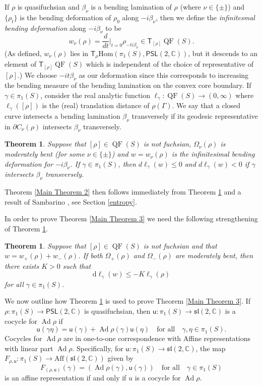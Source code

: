 \documentclass{amsart}
\theoremstyle{plain}
\newtheorem{theorem}[proposition]{Theorem}
\theoremstyle{definition}
\theoremstyle{remark}
\newcommand{\Ad}{\operatorname{Ad}}
\newcommand{\QF}{\operatorname{QF}}
\newcommand{\PSL}{\mathsf{PSL}}
\renewcommand{\sf}[1]{{\mathsf{#1}}}
\newcommand{\C}{\mathbb C}
\renewcommand{\sl}{\mathfrak{sl}}
\newcommand{\<}{\left <}
\renewcommand{\>}{\right >}
\newcommand{\g}{\gamma}
\newcommand{\co}{\sf u}
\renewcommand{\C}{\mathbb C}
\newcommand{\dd}{{\mathrm{d}}}
\begin{document}
If  $\rho$ is quasifuchsian and $\beta_\nu$ is a bending lamination of $\rho$ (where $\nu\in\{\pm\}$) and
$\{\rho_t\}$ is the bending deformation of $\rho_0$ along  $-i\beta_\nu$, then we define the {\em infinitesmal bending deformation} along
$-i\beta_\nu$ to be
$$w_\nu(\rho)=\frac{d}{dt}\Big|_{t=0}\rho_{-ti\beta_\nu}\in \sf{T}_{[\rho]}\QF(S).$$
(As defined, $w_\nu(\rho)$ lies in $\sf{T}_\rho\mathrm{Hom}(\pi_1(S),\PSL(2,\C))$, but it descends to an element of $\sf{T}_{[\rho]}\QF(S)$ which is
independent of the choice of representative of $[\rho]$.)
We choose $-it\beta_\nu$ as our deformation since this corresponds to increasing the bending measure of the bending lamination on the convex core boundary. 
If $\gamma\in\pi_1(S)$, consider the real analytic function \hbox{$\ell_\gamma:\QF(S)\to (0,\infty)$} where
$\ell_\gamma([\rho])$ is the (real) translation distance of $\rho(\Gamma)$. 
We say that a closed  curve intersects a bending lamination $\beta_\nu$ transversely if its geodesic representative in $\partial C_\nu(\rho)$ intersects $\beta_\nu$
transversely.



\begin{theorem}
\label{Main Theorem 1}
Suppose that $[\rho]\in \QF(S)$ is not fuchsian, $\Omega_\nu(\rho)$ is moderately bent (for some $\nu\in\{\pm\}$) and
$w=w_\nu(\rho)$ is the infinitesimal bending deformation for $-i\beta_\nu$.
If $\gamma\in \pi_1(S)$, then $d\ell_\gamma(w)\le 0$ and $d\ell_\gamma(w) <0$ if  $\gamma$ intersects $\beta_\nu$ transversely.
\end{theorem}

Theorem \ref{Main Theorem 2} then follows immediately from Theorem \ref{Main Theorem 1} and a result of Sambarino \cite[Lemma 2.32]{sambarino},
see Section \ref{entropy}.

\medskip

In order to prove Theorem \ref{Main Theorem 3} we need the following strengthening of Theorem \ref{Main Theorem 1}.

\begin{theorem}\label{Main Theorem 4}
Suppose that $[\rho]\in \QF(S)$ is not fuchsian and that $w= w_+(\rho)+w_-(\rho)$. If both $\Omega_+(\rho)$ and $\Omega_-(\rho)$ are
moderately bent, then there exists  $K > 0$ such that
$$\dd\ell_\g(w) \leq  -K \ell_\g(\rho)$$
for all $\gamma\in\pi_1(S)$.
\end{theorem}

We now outline how Theorem \ref{Main Theorem 4} is used to prove Theorem \ref{Main Theorem 3}.
If $\rho:\pi_1(S)\to\PSL(2,\C)$ is quasifuchsian, then $\co:\pi_1(S)\to\sl(2,\C)$ is a cocycle for $\Ad\rho$ if
$$\co(\g\eta)=\co(\g)+\Ad\rho(\g)\co(\eta)\quad\text{for all}\quad \gamma,\eta\in\pi_1(S).$$
Cocycles for $\Ad\rho$ are in one-to-one correspondence with Affine representations with linear part $\Ad\rho$. Specifically, for $\co:\pi_1(S)\to\sl(2,\C)$, 
the map $F_{\rho,\co}:\pi_1(S)\to\mathrm{Aff}(\sl(2,\C))$ given by
$$F_{(\rho,\co)}(\g)=(\Ad\rho(\g),\co(\g))\quad \mbox{for all} \quad \g\in\pi_1(S)$$
is an affine representation if and only if $u$ is a cocycle for $\Ad\rho$. 
\end{document}
